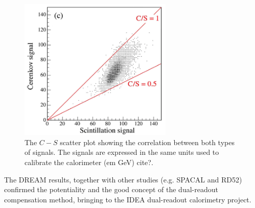 \begin{figure}
	\centering
	\includegraphics[width=0.65\textwidth]{IMG/Cap2/theta_DREAM.png}
	\caption{ The $C-S$ scatter plot showing the correlation between both types of signals. The signals are expressed in the same units used to calibrate the calorimeter (em GeV) cite?.}
	\label{fig:theta_DREAM}
\end{figure}

The DREAM results, together with other studies (e.g. SPACAL and RD52) confirmed the potentiality and the good concept of the dual-readout compensation method, bringing to the IDEA dual-readout calorimetry project.